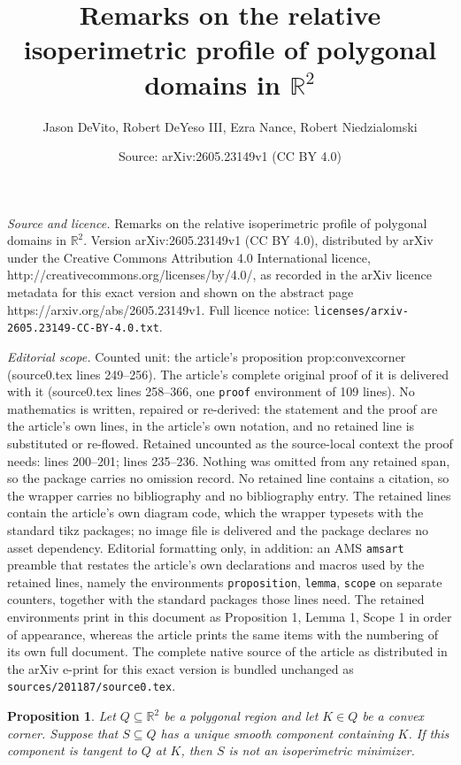 \documentclass[10pt,a4paper]{amsart}
\title{Remarks on the relative isoperimetric profile of polygonal domains in $\mathbb{R}^2$}
\author{Jason DeVito, Robert DeYeso III, Ezra Nance, Robert Niedzialomski}
\date{Source: arXiv:2605.23149v1 (CC BY 4.0)}
\newtheorem{proposition}{Proposition}
\begin{document}
\maketitle

\noindent\emph{Source and licence.} Remarks on the relative isoperimetric profile of polygonal domains in $\mathbb{R}^2$. Version arXiv:2605.23149v1 (CC BY 4.0), distributed by arXiv under the Creative Commons Attribution 4.0 International licence, http://creativecommons.org/licenses/by/4.0/, as recorded in the arXiv licence metadata for this exact version and shown on the abstract page https://arxiv.org/abs/2605.23149v1. Full licence notice: \texttt{licenses/arxiv-2605.23149-CC-BY-4.0.txt}.\par\smallskip

\noindent\textit{Editorial scope.} Counted unit: the article's proposition prop:convexcorner (source0.tex lines 249--256). The article's complete original proof of it is delivered with it (source0.tex lines 258--366, one \texttt{proof} environment of 109 lines). No mathematics is written, repaired or re-derived: the statement and the proof are the article's own lines, in the article's own notation, and no retained line is substituted or re-flowed.  Retained uncounted as the source-local context the proof needs: lines 200--201; lines 235--236.  Nothing was omitted from any retained span, so the package carries no omission record.  No retained line contains a citation, so the wrapper carries no bibliography and no bibliography entry.  The retained lines contain the article's own diagram code, which the wrapper typesets with the standard tikz packages; no image file is delivered and the package declares no asset dependency.  Editorial formatting only, in addition: an AMS \texttt{amsart} preamble that restates the article's own declarations and macros used by the retained lines, namely the environments \texttt{proposition}, \texttt{lemma}, \texttt{scope} on separate counters, together with the standard packages those lines need.  The retained environments print in this document as Proposition 1, Lemma 1, Scope 1 in order of appearance, whereas the article prints the same items with the numbering of its own full document.  The complete native source of the article as distributed in the arXiv e-print for this exact version is bundled unchanged as \texttt{sources/201187/source0.tex}.
\begin{proposition}\label{prop:circleTangentToSide} Let $Q\subseteq\mathbb{R}^2$ be a polygonal region and let $K\in Q$ be a convex corner.  Suppose that $S\subseteq Q$ has a unique smooth component containing $K$.  If this component is tangent to $Q$ at $K$, then $S$ is not an isoperimetric minimizer.
\end{proposition}
\end{document}

